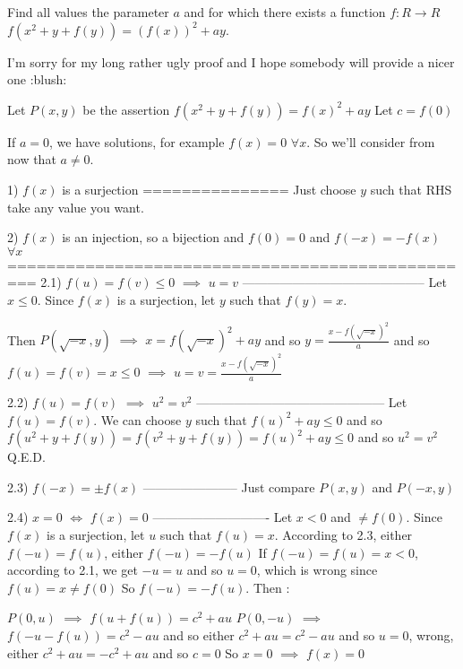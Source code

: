 \begin{solution}
	\begin{tcolorbox}Find all values the parameter $ a$ and for which there exists a function $ f: R \rightarrow R$ 
$ f(x^2 + y + f(y)) = (f(x))^2 + ay$.\end{tcolorbox}

I'm sorry for my long rather ugly proof and I hope somebody will provide a nicer one  :blush: 

Let $ P(x,y)$ be the assertion $ f(x^2 + y + f(y)) = f(x)^2 + ay$
Let $ c = f(0)$

If $ a = 0$, we have solutions, for example $ f(x) = 0$ $ \forall x$.
So we'll consider from now that $ a\ne 0$.

1) $ f(x)$ is a surjection
===============
Just choose $ y$ such that RHS take any value you want.

2) $ f(x)$ is an injection, so a bijection and $ f(0) = 0$ and $ f( - x) = - f(x)$ $ \forall x$
=================================================
2.1) $ f(u) = f(v)\le 0$ $ \implies$ $ u = v$
--------------------------------------------
Let $ x\le 0$. Since $ f(x)$ is a surjection, let $ y$ such that $ f(y) = x$. 

Then $ P(\sqrt { - x},y)$ $ \implies$ $ x = f(\sqrt { - x})^2 + ay$ and so $ y = \frac {x - f(\sqrt { - x})^2}a$ and so $ f(u) = f(v) = x\le 0$ $ \implies$ $ u = v = \frac {x - f(\sqrt { - x})^2}a$

2.2) $ f(u) = f(v)$ $ \implies$ $ u^2 = v^2$
---------------------------------------------
Let $ f(u) = f(v)$. We can choose $ y$ such that $ f(u)^2 + ay \le 0$ and so $ f(u^2 + y + f(y)) = f(v^2 + y + f(y)) = f(u)^2 + ay\le 0$ and so $ u^2 = v^2$
Q.E.D.

2.3) $ f( - x) = \pm f(x)$
-----------------------
Just compare $ P(x,y)$ and $ P( - x,y)$

2.4) $ x = 0$ $ \iff$ $ f(x) = 0$
----------------------------
Let $ x < 0$ and $ \ne f(0)$. Since $ f(x)$ is a surjection, let $ u$ such that $ f(u) = x$. According to 2.3, either $ f( - u) = f(u)$, either $ f( - u) = - f(u)$
If $ f( - u) = f(u) = x < 0$, according to 2.1, we get $ - u = u$ and so $ u = 0$, which is wrong since $ f(u) = x\ne f(0)$
So $ f( - u) = - f(u)$. Then :

$ P(0,u)$ $ \implies$ $ f(u + f(u)) = c^2 + au$
$ P(0, - u)$ $ \implies$ $ f( - u - f(u)) = c^2 - au$ and so either $ c^2 + au = c^2 - au$ and so $ u = 0$, wrong, either $ c^2 + au = - c^2 + au$ and so $ c = 0$
So $ x = 0$ $ \implies$ $ f(x) = 0$


\end{solution}
